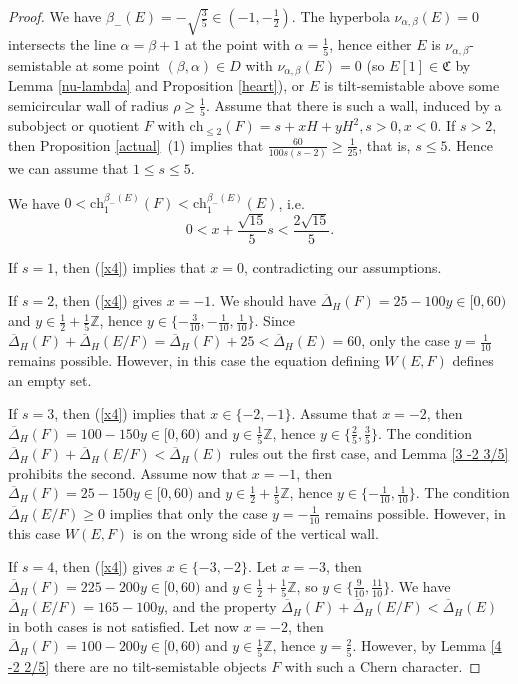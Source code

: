 \documentclass{amsart}
\begin{document}
	\begin{proof} We have $\beta_-(E)=-\sqrt{\frac 35}\in(-1,-\frac 12)$. The hyperbola $\nu_{\alpha,\beta}(E)=0$ intersects the line $\alpha=\beta+1$ at the point with $\alpha=\frac 15$, hence either $E$ is $\nu_{\alpha,\beta}$-semistable at some point $(\beta,\alpha)\in D$ with $\nu_{\alpha,\beta}(E)=0$ (so $E[1]\in\mathfrak C$ by Lemma \ref{nu-lambda} and Proposition \ref{heart}), or $E$ is tilt-semistable above some semicircular wall of radius $\rho\ge\frac 15$. Assume that there is such a wall, induced by a subobject or quotient $F$ with $\mathrm{ch}_{\le 2}(F)=s+xH+yH^2,s>0,x<0$. If $s>2$, then Proposition \ref{actual}~(1) implies that $\frac{60}{100s(s-2)}\ge\frac{1}{25}$, that is, $s\le 5$. Hence we can assume that $1\le s\le 5$.
		
		We have $0<\mathrm{ch}_1^{\beta_-(E)}(F)<\mathrm{ch}_1^{\beta_-(E)}(E)$, i.e.
		\begin{equation}\label{x4}0<x+\frac{\sqrt{15}}{5}s<\frac{2\sqrt{15}}{5}.
		\end{equation}
		
		If $s=1$, then (\ref{x4}) implies that $x=0$, contradicting our assumptions.
		
		If $s=2$, then (\ref{x4}) gives $x=-1$. We should have $\overline{\Delta}_H(F)=25-100y\in[0,60)$ and $y\in\frac 12+\frac 15\mathbb Z$, hence $y\in\{-\frac{3}{10},-\frac{1}{10},\frac{1}{10}\}$. Since $\overline{\Delta}_H(F)+\overline{\Delta}_H(E/F)=\overline{\Delta}_H(F)+25<\overline{\Delta}_H(E)=60$, only the case $y=\frac{1}{10}$ remains possible. However, in this case the equation defining $W(E,F)$ defines an empty set.
		
		If $s=3$, then (\ref{x4}) implies that $x\in\{-2,-1\}$. Assume that $x=-2$, then $\overline{\Delta}_H(F)=100-150y\in[0,60)$ and $y\in\frac 15\mathbb Z$, hence $y\in\{\frac 25,\frac 35\}$. The condition $\overline{\Delta}_H(F)+\overline{\Delta}_H(E/F)<\overline{\Delta}_H(E)$ rules out the first case, and Lemma \ref{3 -2 3/5} prohibits the second. Assume now that $x=-1$, then $\overline{\Delta}_H(F)=25-150y\in[0,60)$ and $y\in\frac 12+\frac 15\mathbb Z$, hence $y\in\{-\frac{1}{10},\frac{1}{10}\}$. The condition $\overline{\Delta}_H(E/F)\ge 0$ implies that only the case $y=-\frac{1}{10}$ remains possible. However, in this case $W(E,F)$ is on the wrong side of the vertical wall.
		
		If $s=4$, then (\ref{x4}) gives $x\in\{-3,-2\}$. Let $x=-3$, then $\overline{\Delta}_H(F)=225-200y\in[0,60)$ and $y\in\frac 12+\frac 15\mathbb Z$, so $y\in\{\frac{9}{10},\frac{11}{10}\}$. We have $\overline{\Delta}_H(E/F)=165-100y$, and the property $\overline{\Delta}_H(F)+\overline{\Delta}_H(E/F)<\overline{\Delta}_H(E)$ in both cases is not satisfied. Let now $x=-2$, then $\overline{\Delta}_H(F)=100-200y\in[0,60)$ and $y\in\frac 15\mathbb Z$, hence $y=\frac 25$. However, by Lemma \ref{4 -2 2/5} there are no tilt-semistable objects $F$ with such a Chern character.
		

\end{proof}
\end{document}
